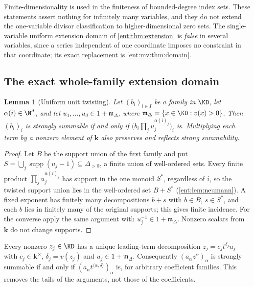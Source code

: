 \documentclass[11pt]{article}
\theoremstyle{plain}
\newtheorem{lemma}[lemma]{Lemma}
\theoremstyle{plain}
\theoremstyle{plain}
\theoremstyle{definition}
\theoremstyle{definition}
\theoremstyle{definition}
\theoremstyle{definition}
\theoremstyle{remark}
\DeclareMathOperator{\supp}{supp}\DeclareMathOperator{\lc}{lc}
\newcommand{\kk}{\mathbf k}\newcommand{\PP}{\mathbb P}
\newcommand{\inner}[2]{\langle#1,#2\rangle}
\begin{document}
Finite-dimensionality is used in the finiteness of bounded-degree index sets.
These statements assert nothing for infinitely many variables, and they do
not extend the one-variable divisor classification to higher-dimensional zero
sets. The single-variable uniform extension domain of \cref{ent:thm:extension}
is \emph{false} in several variables, since a series independent of one
coordinate imposes no constraint in that coordinate; its exact replacement is
\cref{ent:mv:thm:domain}.

\subsection{The exact whole-family extension domain}
\label{ent:mv:subsec:domain}

\begin{lemma}[Uniform unit twisting]\label{ent:mv:lem:twist}
Let $(b_i)_{i\in I}$ be a family in $\KD$, let $\alpha(i)\in\N^d$, and let
$u_1,\ldots,u_d\in1+\mathfrak m_\Delta$, where
$\mathfrak m_\Delta=\{x\in\KD:v(x)>0\}$. Then $(b_i)_i$ is strongly summable
if and only if $\bigl(b_i\prod_ju_j^{\alpha(i)_j}\bigr)_i$ is. Multiplying
each term by a nonzero element of $\kk$ also preserves and reflects strong
summability.
\end{lemma}
\begin{proof}
Let $B$ be the support union of the first family and put
$S=\bigcup_j\supp(u_j-1)\subseteq\Delta_{>0}$, a finite union of
well-ordered sets. Every finite product $\prod_ju_j^{\alpha(i)_j}$ has
support in the one monoid $S^*$, regardless of $i$, so the twisted support
union lies in the well-ordered set $B+S^*$ (\cref{ent:lem:neumann}). A fixed
exponent has finitely many decompositions $b+s$ with $b\in B$, $s\in S^*$,
and each $b$ lies in finitely many of the original supports; this gives
finite incidence. For the converse apply the same argument with
$u_j^{-1}\in1+\mathfrak m_\Delta$. Nonzero scalars from $\kk$ do not change
supports.
\end{proof}

Every nonzero $z_j\in\KD$ has a unique leading-term decomposition
$z_j=c_jt^{\delta_j}u_j$ with $c_j\in\kk^\times$, $\delta_j=v(z_j)$ and
$u_j\in1+\mathfrak m_\Delta$. Consequently $(a_\alpha z^\alpha)_\alpha$ is
strongly summable if and only if $(a_\alpha t^{\inner\alpha\delta})_\alpha$
is, for arbitrary coefficient families. This removes the tails of the
arguments, not those of the coefficients.
\end{document}
